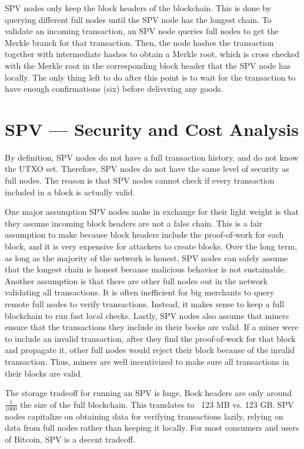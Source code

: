 \documentclass[11pt]{article}
\begin{document}
 SPV nodes only keep the block headers of the blockchain. This is done by querying different full nodes until the SPV node has the longest chain. To validate an incoming transaction, an SPV node queries full nodes to get the Merkle branch for that transaction. Then, the node hashes the transaction together with intermediate hashes to obtain a Merkle root, which is cross checked with the Merkle root in the corresponding block header that the SPV node has locally. The only thing left to do after this point is to wait for the transaction to have enough confirmations (six) before delivering any goods.
 
 \section*{SPV --- Security and Cost Analysis}
 
 By definition, SPV nodes do not have a full transaction history, and do not know the UTXO set. Therefore, SPV nodes do not have the same level of security as full nodes. The reason is that SPV nodes cannot check if every transaction included in a block is actually valid.
 
 One major assumption SPV nodes make in exchange for their light weight is that they assume incoming block headers are not a false chain. This is a fair assumption to make because block headers include the proof-of-work for each block, and it is very expensive for attackers to create blocks. Over the long term, as long as the majority of the network is honest, SPV nodes can safely assume that the longest chain is honest because malicious behavior is not sustainable. Another assumption is that there are other full nodes out in the network validating all transactions. It is often inefficient for big merchants to query remote full nodes to verify transactions. Instead, it makes sense to keep a full blockchain to run fast local checks. Lastly, SPV nodes also assume that miners ensure that the transactions they include in their bocks are valid. If a miner were to include an invalid transaction, after they find the proof-of-work for that block and propagate it, other full nodes would reject their block because of the invalid transaction. Thus, miners are well incentivized to make sure all transactions in their blocks are valid.
 
 The storage tradeoff for running an SPV is huge. Bock headers are only around $\frac{1}{1000}$ the size of the full blockchain. This translates to ~123 MB vs. 123 GB. SPV nodes capitalize on obtaining data for verifying transactions lazily, relying on data from full nodes rather than keeping it locally. For most consumers and users of Bitcoin, SPV is a decent tradeoff.
 
\end{document}
